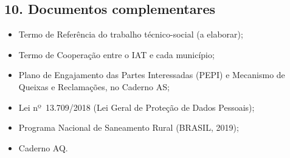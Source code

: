 {}
\subsection*{10. Documentos complementares}

\begin{itemize}
  \item Termo de Referência do trabalho técnico-social (a elaborar);
  \item Termo de Cooperação entre o IAT e cada município;
  \item Plano de Engajamento das Partes Interessadas (PEPI) e Mecanismo de Queixas e Reclamações, no Caderno AS;
  \item Lei nº~13.709/2018 (Lei Geral de Proteção de Dados Pessoais);
  \item Programa Nacional de Saneamento Rural (BRASIL, 2019);
  \item Caderno AQ.
\end{itemize}
